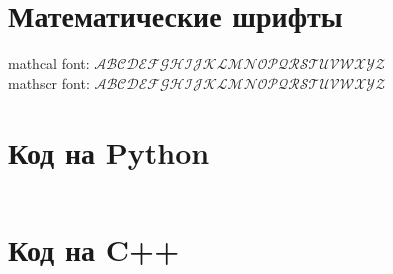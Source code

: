 \section{Математические шрифты}

mathcal font: $\mathcal{ABCDEFGHIJKLMNOPQRSTUVWXYZ}$\\
mathscr font: $\mathscr{ABCDEFGHIJKLMNOPQRSTUVWXYZ}$

\section{Код на Python}
\inputminted{python}{python_example.py}

\section{Код на C++}
\inputminted{c++}{cpp_example.cpp}


